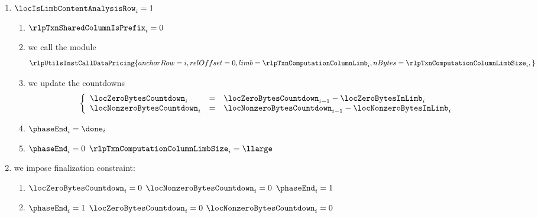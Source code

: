\begin{enumerate}[resume]
	\item \If $\locIsLimbContentAnalysisRow _{i} = 1$ \Then
		\begin{enumerate}
			\item $\rlpTxnSharedColumnIsPrefix     _{i} = 0$
			\item we call the \rlpUtilsMod{} module
				\[
					\rlpUtilsInstCallDataPricing {
						anchorRow = i              ,
						relOffset = 0              ,
						limb      = \rlpTxnComputationColumnLimb     _{i} ,
						nBytes    = \rlpTxnComputationColumnLimbSize _{i} ,
					}
				\]
			\item we update the countdowns
				\[
					\left\{ \begin{array}{lcl}
						\locZeroBytesCountdown    _{i} & = & \locZeroBytesCountdown    _{i - 1} - \locZeroBytesInLimb    _{i} \\
						\locNonzeroBytesCountdown _{i} & = & \locNonzeroBytesCountdown _{i - 1} - \locNonzeroBytesInLimb _{i} \\
					\end{array} \right.
				\]
			\item $\phaseEnd _{i} = \done _{i}$
			\item \If $\phaseEnd _{i} = 0$ \Then $\rlpTxnComputationColumnLimbSize _{i} = \llarge$
		\end{enumerate}
	\item we impose finalization constraint:
		\begin{enumerate}[resume]
			\item \If $\locZeroBytesCountdown _{i} = 0$ \et $\locNonzeroBytesCountdown _{i} = 0$ \Then $\phaseEnd _{i} = 1$
			\item \If $\phaseEnd _{i} = 1$ \Then $\locZeroBytesCountdown _{i} = 0$ \et   $\locNonzeroBytesCountdown _{i} = 0$
		\end{enumerate}
\end{enumerate}

